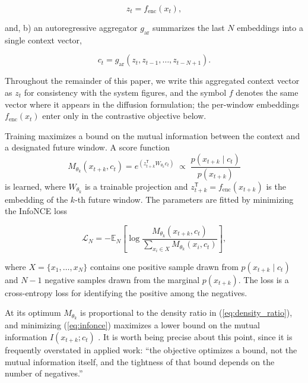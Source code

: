 \documentclass[lettersize,journal]{IEEEtran}
\begin{document}
\begin{equation}
z_t = f_{\mathrm{enc}}(x_t),
\end{equation}

and, b) an autoregressive aggregator $g_{\mathrm{ar}}$ summarizes the last
$N$ embeddings into a single context vector,

\begin{equation}
c_t = g_{\mathrm{ar}}(z_t, z_{t-1}, \ldots, z_{t-N+1}).
\end{equation}

Throughout the remainder of this paper, we write this aggregated context
vector as $z_t$ for consistency with the system figures, and the symbol
$f$ denotes the same vector where it appears in the diffusion
formulation; the per-window embeddings $f_{\mathrm{enc}}(x_t)$ enter only
in the contrastive objective below.

Training maximizes a bound on the mutual information between the context
and a designated future window. A score function
\begin{equation}
M_{\theta_k}(x_{t+k}, c_t)
 = e^{\left(z_{t+k}^{\mathsf{T}} W_{\theta_k} c_t\right)}
 \;\propto\; \frac{p(x_{t+k} \mid c_t)}{p(x_{t+k})}
\label{eq:density_ratio}
\end{equation}
is learned, where $W_{\theta_k}$ is a trainable projection and
$z_{t+k}^{\mathsf{T}} = f_{\mathrm{enc}}(x_{t+k})$ is the embedding of
the $k$-th future window. The parameters are fitted by minimizing the
InfoNCE loss

\begin{equation}
\mathcal{L}_N = -\mathbb{E}_N\!\left[
\log \frac{M_{\theta_k}(x_{t+k}, c_t)}
{\sum_{x_i \in X} M_{\theta_k}(x_i, c_t)}\right],
\label{eq:infonce}
\end{equation}

where $X = \{x_1, \ldots, x_N\}$ contains one positive sample drawn from
$p(x_{t+k} \mid c_t)$ and $N-1$ negative samples drawn from the marginal
$p(x_{t+k})$.
The loss is a cross-entropy loss for identifying the positive
among the negatives.

At its optimum $M_{\theta_k}$ is proportional to the
density ratio in (\ref{eq:density_ratio}), and minimizing
(\ref{eq:infonce}) maximizes a lower bound on the mutual information
$I(x_{t+k}; c_t)$ \cite{Oord2018}.
It is worth being precise about this point, since it is frequently 
overstated in applied work: ``the objective
optimizes a bound, not the mutual information itself, and the tightness
of that bound depends on the number of negatives.''
\end{document}
